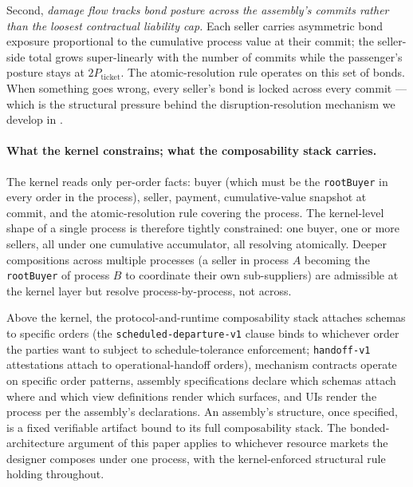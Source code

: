 \documentclass[11pt,a4paper]{article}
\theoremstyle{definition}
\theoremstyle{remark}
\begin{document}
Second, \emph{damage flow tracks bond posture across the
assembly's commits rather than the loosest contractual liability
cap.} Each seller carries asymmetric bond exposure proportional
to the cumulative process value at their commit; the seller-side
total grows super-linearly with the number of commits while the
passenger's posture stays at $2 P_{\text{ticket}}$. The
atomic-resolution rule operates on this set of bonds. When
something goes wrong, every seller's bond is locked across every
commit --- which is the structural pressure behind the
disruption-resolution mechanism we develop in
.

\paragraph{What the kernel constrains; what the composability stack carries.}
The kernel reads only per-order facts: buyer (which must be the
\texttt{rootBuyer} in every order in the process), seller,
payment, cumulative-value snapshot at commit, and the
atomic-resolution rule covering the process. The kernel-level
shape of a single process is therefore tightly constrained: one
buyer, one or more sellers, all under one cumulative accumulator,
all resolving atomically. Deeper compositions across multiple
processes (a seller in process $A$ becoming the
\texttt{rootBuyer} of process $B$ to coordinate their own
sub-suppliers) are admissible at the kernel layer but resolve
process-by-process, not across.

Above the kernel, the protocol-and-runtime composability stack
attaches schemas to specific orders (the
\texttt{scheduled-departure-v1} clause binds to whichever order
the parties want to subject to schedule-tolerance enforcement;
\texttt{handoff-v1} attestations attach to operational-handoff
orders), mechanism contracts operate on specific order patterns,
assembly specifications declare which schemas attach where and
which view definitions render which surfaces, and UIs render the
process per the assembly's declarations. An assembly's structure,
once specified, is a fixed verifiable artifact bound to its full
composability stack. The bonded-architecture argument of this
paper applies to whichever resource markets the designer composes
under one process, with the kernel-enforced structural rule
holding throughout.
\end{document}
